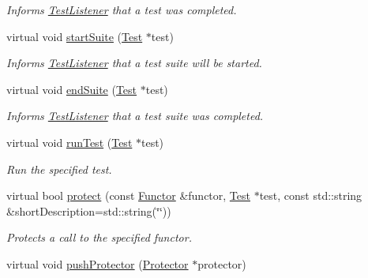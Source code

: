 \begin{DoxyCompactItemize}
\begin{DoxyCompactList}\small\item\em Informs \hyperlink{class_test_listener}{Test\+Listener} that a test was completed. \end{DoxyCompactList}\item 
virtual void \hyperlink{class_test_result_a9e21095aa704141c285819b99785326f}{start\+Suite} (\hyperlink{class_test}{Test} $\ast$test)\hypertarget{class_test_result_a9e21095aa704141c285819b99785326f}{}\label{class_test_result_a9e21095aa704141c285819b99785326f}

\begin{DoxyCompactList}\small\item\em Informs \hyperlink{class_test_listener}{Test\+Listener} that a test suite will be started. \end{DoxyCompactList}\item 
virtual void \hyperlink{class_test_result_acacd853a4392a0473b3407051d79d471}{end\+Suite} (\hyperlink{class_test}{Test} $\ast$test)\hypertarget{class_test_result_acacd853a4392a0473b3407051d79d471}{}\label{class_test_result_acacd853a4392a0473b3407051d79d471}

\begin{DoxyCompactList}\small\item\em Informs \hyperlink{class_test_listener}{Test\+Listener} that a test suite was completed. \end{DoxyCompactList}\item 
virtual void \hyperlink{class_test_result_ae00af1cdee85b14923b80a01678478ee}{run\+Test} (\hyperlink{class_test}{Test} $\ast$test)
\begin{DoxyCompactList}\small\item\em Run the specified test. \end{DoxyCompactList}\item 
virtual bool \hyperlink{class_test_result_a243b3097a3d9468abc61e7910bbaa8b7}{protect} (const \hyperlink{class_functor}{Functor} \&functor, \hyperlink{class_test}{Test} $\ast$test, const std\+::string \&short\+Description=std\+::string(\char`\"{}\char`\"{}))
\begin{DoxyCompactList}\small\item\em Protects a call to the specified functor. \end{DoxyCompactList}\item 
virtual void \hyperlink{class_test_result_a1a4fbbca38cb73e8e00905193b7593dc}{push\+Protector} (\hyperlink{class_protector}{Protector} $\ast$protector)\hypertarget{class_test_result_a1a4fbbca38cb73e8e00905193b7593dc}{}\label{class_test_result_a1a4fbbca38cb73e8e00905193b7593dc}


\end{DoxyCompactItemize}
